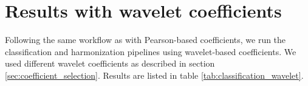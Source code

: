 \documentclass[11pt]{report}
\begin{document}
\newpage

\section{Results with wavelet coefficients}\label{sec:wavelet_results}
Following the same workflow as with Pearson-based coefficients, we run the classification and harmonization pipelines using wavelet-based coefficients.
We used different wavelet coefficients as described in section \ref{sec:coefficient_selection}.
Results are listed in table \ref{tab:classification_wavelet}.

  
\end{document}
